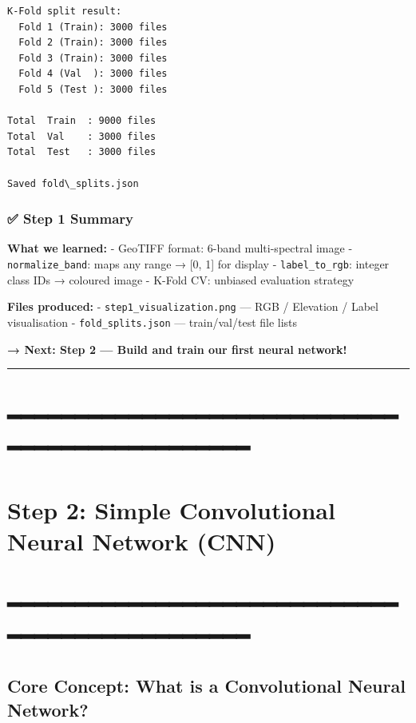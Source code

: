 \documentclass[11pt]{article}
\begin{document}
    \begin{Verbatim}[commandchars=\\\{\}]
K-Fold split result:
  Fold 1 (Train): 3000 files
  Fold 2 (Train): 3000 files
  Fold 3 (Train): 3000 files
  Fold 4 (Val  ): 3000 files
  Fold 5 (Test ): 3000 files

Total  Train  : 9000 files
Total  Val    : 3000 files
Total  Test   : 3000 files

Saved fold\_splits.json
    \end{Verbatim}

    \subsubsection{✅ Step 1 Summary}\label{step-1-summary}

\textbf{What we learned:} - GeoTIFF format: 6-band multi-spectral image
- \texttt{normalize\_band}: maps any range → {[}0, 1{]} for display -
\texttt{label\_to\_rgb}: integer class IDs → coloured image - K-Fold CV:
unbiased evaluation strategy

\textbf{Files produced:} - \texttt{step1\_visualization.png} --- RGB /
Elevation / Label visualisation - \texttt{fold\_splits.json} ---
train/val/test file lists

\textbf{→ Next: Step 2 --- Build and train our first neural network!}

    \begin{center}\rule{0.5\linewidth}{0.5pt}\end{center}

\section{━━━━━━━━━━━━━━━━━━━━━━━━━━━━━━━━━━━━━━━━━━━━━━━}\label{section}

\section{Step 2: Simple Convolutional Neural Network
(CNN)}\label{step-2-simple-convolutional-neural-network-cnn}

\section{━━━━━━━━━━━━━━━━━━━━━━━━━━━━━━━━━━━━━━━━━━━━━━━}\label{section-1}

\subsection{Core Concept: What is a Convolutional Neural
Network?}\label{core-concept-what-is-a-convolutional-neural-network}
\end{document}
